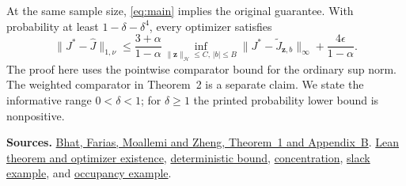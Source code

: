 \documentclass[12pt,a4paper]{article}
\begin{document}
At the same sample size, \eqref{eq:main} implies the original guarantee. With probability at least \(1-\delta-\delta^4\), every optimizer satisfies
\begin{equation}
 \|J^*-\widehat J\|_{1,\nu}
 \le \frac{3+\alpha}{1-\alpha}
       \inf_{\|\mathbf z\|_{\mathcal H}\le C,\,|b|\le B}
       \|J^*-\widetilde J_{\mathbf z,b}\|_\infty+\frac{4\epsilon}{1-\alpha}.
 \tag{19}
\end{equation} The proof here uses the pointwise comparator
bound for the ordinary sup norm. The weighted comparator in Theorem~2
is a separate claim. We state the informative range \(0<\delta<1\);
for \(\delta\ge1\) the printed probability lower bound is nonpositive.

{\small
\textbf{Sources.}
\href{https://moallemi.com/ciamac/papers/kernel-adp-2012.pdf\#page=13}{Bhat, Farias, Moallemi and Zheng, Theorem~1 and Appendix~B}.
\href{https://github.com/nikhilpb/kadp/blob/main/Kadp/Theorem1.lean}{Lean theorem and optimizer existence},
\href{https://github.com/nikhilpb/kadp/blob/main/Kadp/Approximation.lean}{deterministic bound},
\href{https://github.com/nikhilpb/kadp/blob/main/Kadp/UniformDeviation.lean}{concentration},
\href{https://github.com/nikhilpb/kadp/blob/main/Kadp/Examples/Theorem1.lean}{slack example},
and \href{https://github.com/nikhilpb/kadp/blob/main/Kadp/Examples/Occupancy.lean}{occupancy example}.}
\end{document}
